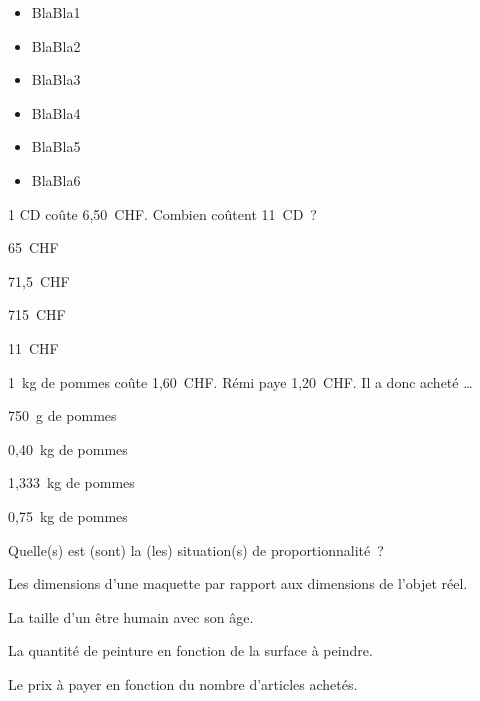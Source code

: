 \begin{acquis}
\begin{itemize}
\item BlaBla1
\item BlaBla2
\item BlaBla3
\item BlaBla4
\item BlaBla5
\item BlaBla6
\end{itemize}
\end{acquis}


\begin{QCM}
  \begin{GroupeQCM}
    \begin{exercice}
     1 CD coûte 6,50 CHF. Combien coûtent 11 CD ?
      \begin{ChoixQCM}{4}
      \item 65 CHF
      \item 71,5 CHF
      \item 715 CHF
      \item 11 CHF
      \end{ChoixQCM}
\begin{corrige}
   \end{corrige}
    \end{exercice}
    
   
    \begin{exercice}
      1 kg de pommes coûte 1,60 CHF. Rémi paye 1,20 CHF. Il a donc acheté \ldots
      \begin{ChoixQCM}{4}
      \item 750 g de pommes
      \item 0,40 kg de pommes
      \item 1,333 kg de pommes
      \item 0,75 kg de pommes
      \end{ChoixQCM}
\begin{corrige}
   \end{corrige}
    \end{exercice}
    
    
    \begin{exercice}
      Quelle(s) est (sont) la (les) situation(s) de proportionnalité ?
      \begin{ChoixQCM}{4}
      \item Les dimensions d'une maquette par rapport aux dimensions de l'objet réel.
      \item La taille d'un être humain avec son âge.
      \item La quantité de peinture en fonction de la surface à peindre.
      \item Le prix à payer en fonction du nombre d'articles achetés.
      \end{ChoixQCM}
\begin{corrige}
   \end{corrige}
    \end{exercice}
    

\end{GroupeQCM}
\end{QCM}
